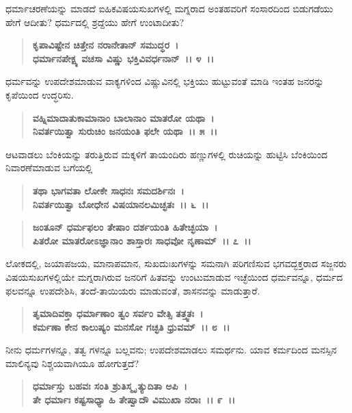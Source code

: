 ಧರ್ಮಾಚರಣೆಯನ್ನು ಮಾಡದೆ ಐಹಿಕವಿಷಯಸುಖಗಳಲ್ಲಿ ಮಗ್ನರಾದ ಅಂತಹವರಿಗೆ ಸಂಸಾರದಿಂದ ಬಿಡುಗಡೆಯು ಹೇಗೆ ಆದೀತು? ಧರ್ಮದಲ್ಲಿ ಶ್ರದ್ದೆಯು ಹೇಗೆ ಉಂಟಾದೀತು?

\begin{verse}
\textbf{ಕೃಪಾವಿಷ್ಟೇನ ಚಿತ್ತೇನ ನರಾನೇತಾನ್ ಸಮುದ್ಧರ~।}\\\textbf{ಧರ್ಮಾನಪೇಕ್ಷ್ಯ ವಚಸಾ ವಿಷ್ಣು ಭಕ್ತಿವಿವರ್ಧನಾನ್~।। ೪~।।}
\end{verse}

ಧರ್ಮವನ್ನು ಉಪದೇಶಮಾಡುವ ವಾಕ್ಯಗಳಿಂದ ವಿಷ್ಣುವಿನಲ್ಲಿ ಭಕ್ತಿಯು ಹುಟ್ಟುವಂತೆ ಮಾಡಿ ಇಂತಹ ಜನರನ್ನು ಕೃಪೆಯಿಂದ ಉದ್ಧರಿಸು.

\begin{verse}
\textbf{ವಹ್ನಿಮಾದಾತುಕಾಮಾನಾಂ ಬಾಲಾನಾಂ ಮಾತರೋ ಯಥಾ~।}\\\textbf{ನಿವರ್ತಯಿತ್ವಾ ಸುರುಚಿಂ ಜನಯಂತಿ ಫಲೇ ಯಥಾ~।। ೫~।।}
\end{verse}

ಆಟವಾಡಲು ಬೆಂಕಿಯನ್ನು ತರುತ್ತಿರುವ ಮಕ್ಕಳಿಗೆ ತಾಯಂದಿರು ಹಣ್ಣುಗಳಲ್ಲಿ ರುಚಿಯನ್ನು ಹುಟ್ಟಿಸಿ ಬೆಂಕಿಯಿಂದ ನಿವಾರಣೆಮಾಡುವ ಬಗೆಯಲ್ಲಿ

\begin{verse}
\textbf{ತಥಾ ಭಾಗವತಾ ಲೋಕೇ ಸಾಧನಃ ಸಮದರ್ಶಿನಃ~।}\\\textbf{ನಿವರ್ತಯಿತ್ವಾ ಬೋಧೇನ ವಿಷಯಾನಲಮಿಚ್ಛತಃ~।। ೬~।।}
\end{verse}

\begin{verse}
\textbf{ಜಂತೂನ್ ಧರ್ಮಫಲಂ ತೇಷಾಂ ದರ್ಶಯಂತಿ ಹಿತೇಚ್ಛಯಾ~।}\\\textbf{ಪಿತರೋ ಮಾತರೋಽಜ್ಞಾನಾಂ ಶಾಸ್ತಾರಃ ಸಾಧವೋ ನೃಣಾಮ್~।। ೭~।।}
\end{verse}

ಲೋಕದಲ್ಲಿ, ಜಯಾಪಜಯ, ಮಾನಾಪಮಾನ, ಸುಖದುಃಖಗಳನ್ನು ಸಮನಾಗಿ ಪರಿಗಣಿಸುವ ಭಗವದ್ಭಕ್ತರಾದ ಸಜ್ಜನರು ವಿಷಯಸುಖಗಳಲ್ಲಿಯೇ ಮಗ್ನರಾಗಿರುವ ಜನರಿಗೆ ಹಿತವನ್ನು ಉಂಟುಮಾಡುವ ಇಚ್ಛೆಯಿಂದ ಧರ್ಮವನ್ನೂ, ಧರ್ಮದ ಫಲವನ್ನೂ ಉಪದೇಶಿಸಿ, ತಂದೆ-ತಾಯಿಯರು ಮಾಡುವಂತೆ, ಶಾಸನವನ್ನು ಮಾಡುತ್ತಾರೆ.

\begin{verse}
\textbf{ತೃಮಾದಿವಕ್ತಾ ಧರ್ಮಾಣಾಂ ತ್ವಂ ಸರ್ವಂ ವೇತ್ಸಿ ತತ್ತ್ವತಃ~।}\\\textbf{ಕರ್ಮಣಾ ಕೇನ ಕಾಲುಷ್ಯಂ ಮನಸೋ ಗಚ್ಛತಿ ಧ್ರುವಮ್~।। ೮~।।}
\end{verse}

ನೀನು ಧರ್ಮಗಳನ್ನೂ, ತತ್ವ ಗಳನ್ನೂ ಬಲ್ಲವನು; ಉಪದೇಶಮಾಡಲು ಸಮರ್ಥನು. ಯಾವ ಕರ್ಮದಿಂದ ಮನಸ್ಸಿನ ಮಾಲಿನ್ಯವು ನಿಶ್ಚಯವಾಗಿಯೂ ಹೋಗುತ್ತದೆ?

\begin{verse}
\textbf{ಧರ್ಮಾಸ್ತು ಬಹವಃ ಸಂತಿ ಶ್ರುತಿಸ್ಮೃ ತ್ಯುದಿತಾ ಅಪಿ~।}\\\textbf{ತೇ ಧರ್ಮಾಃ ಕಷ್ಟಸಾಧ್ಯಾ ಹಿ ತೇಷ್ವಾದೌ ವಿಮುಖಾ ನರಾಃ~।। ೯~।।}
\end{verse}

